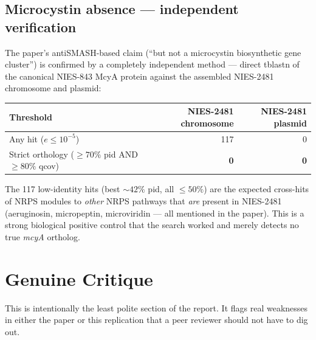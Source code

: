 \documentclass[11pt,letterpaper]{article}
\begin{document}
\subsection{Microcystin absence --- independent verification}
The paper's antiSMASH-based claim (``but not a microcystin biosynthetic gene cluster'') is confirmed by a completely independent method --- direct tblastn of the canonical NIES-843 McyA protein against the assembled NIES-2481 chromosome and plasmid:

\begin{center}
\begin{tabular}{lrr}
\toprule
Threshold & NIES-2481 chromosome & NIES-2481 plasmid \\
\midrule
Any hit ($e \leq 10^{-5}$)                       & 117 & 0 \\
Strict orthology ($\geq70\%$ pid AND $\geq80\%$ qcov) & \textbf{0} & \textbf{0} \\
\bottomrule
\end{tabular}
\end{center}

\noindent The 117 low-identity hits (best $\sim 42\%$ pid, all $\leq 50\%$) are the expected cross-hits of NRPS modules to \emph{other} NRPS pathways that \emph{are} present in NIES-2481 (aeruginosin, micropeptin, microviridin --- all mentioned in the paper). This is a strong biological positive control that the search worked and merely detects no true \emph{mcyA} ortholog.

\section{Genuine Critique}
This is intentionally the least polite section of the report. It flags real weaknesses in either the paper or this replication that a peer reviewer should not have to dig out.
\end{document}

